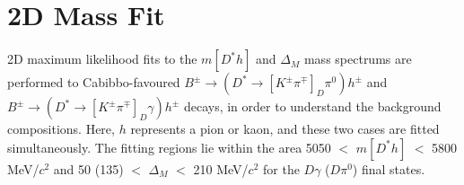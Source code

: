 \documentclass[oneside,12pt]{article}
\begin{document}
{\begin{landscape}
\begin{table}[]
\centering
{}
\caption{{Variables used in the training of the second stage BDT, ranked
by importance. $\gamma^{1}$ and $\gamma^{2}$ refer to the two daughter photons of the
$\pi^0$.}}
\label{table:bdt2TrainingVar}
\end{table}
\end{landscape}
}
\vspace{-3mm}
\section{2D Mass Fit} \label{sec:massfit}

2D maximum likelihood fits to the $m[D^*h]$ and $\Delta_M$ mass spectrums are
performed to Cabibbo-favoured $B^{\pm}\rightarrow (D^*\rightarrow
[K^{\pm}\pi^{\mp}]_D\pi^0)h^{\pm}$ and $B^{\pm}\rightarrow (D^*\rightarrow
[K^{\pm}\pi^{\mp}]_D\gamma)h^{\pm}$ decays, in order to understand the
background compositions. Here, $h$ represents a pion or kaon, and these two
cases are fitted simultaneously. The fitting regions lie within the area 5050
$<$ $m[D^*h]$ $<$ 5800 MeV/$c^2$ and 50 (135) $<$ $\Delta_M$ $<$ 210 MeV/$c^2$
for the $D\gamma$ ($D\pi^0$) final states.
\end{document}
